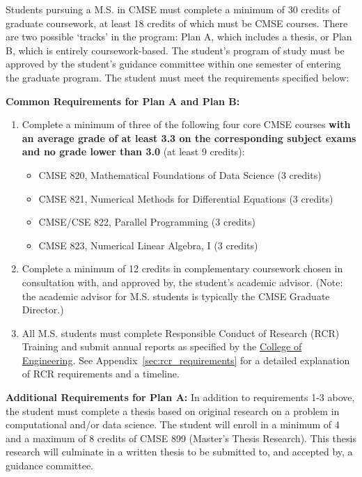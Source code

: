 Students pursuing a M.S. in CMSE must complete a minimum of 30 credits
of graduate coursework, at least 18 credits of which must be CMSE
courses. There are two possible `tracks' in the program: Plan A, which
includes a thesis, or Plan B, which is entirely coursework-based. The
student's program of study must be approved by the student's guidance
committee within one semester of entering the graduate program. The
student must meet the requirements specified below:

\vspace{3mm}
\noindent
\textbf{Common Requirements for Plan A and Plan B:}

\begin{enumerate}

\item Complete a minimum of three of the following four core CMSE
  courses \textbf{with an average grade of at least 3.3 on the
    corresponding subject exams and no grade lower than 3.0} (at least
  9 credits):

\begin{itemize}
    \item  CMSE 820, Mathematical Foundations of Data Science (3 credits)  
    \item  CMSE 821, Numerical Methods for Differential Equations (3 credits)  
    \item  CMSE/CSE 822, Parallel Programming (3 credits)  
    \item  CMSE 823, Numerical Linear Algebra, I (3 credits)  
\end{itemize}

\item Complete a minimum of 12 credits in complementary coursework
  chosen in consultation with, and approved by, the student's academic
  advisor.  (Note: the academic advisor for M.S. students is typically the CMSE Graduate Director.)
 
\item All M.S. students must complete Responsible Conduct of Research (RCR)
  Training and submit annual reports as specified by the
  \href{https://www.egr.msu.edu/academics/graduate/rcr}{College of
    Engineering}.  See Appendix~\ref{sec:rcr_requirements} for a
  detailed explanation of RCR requirements and a timeline.

\end{enumerate}

\vspace{3mm}
\noindent
\textbf{Additional Requirements for Plan A:} In addition to
requirements 1-3 above, the student must complete a thesis based on
original research on a problem in computational and/or data
science. The student will enroll in a minimum of 4 and a maximum of 8
credits of CMSE 899 (Master's Thesis Research). This thesis research
will culminate in a written thesis to be submitted to, and accepted
by, a guidance committee. 

